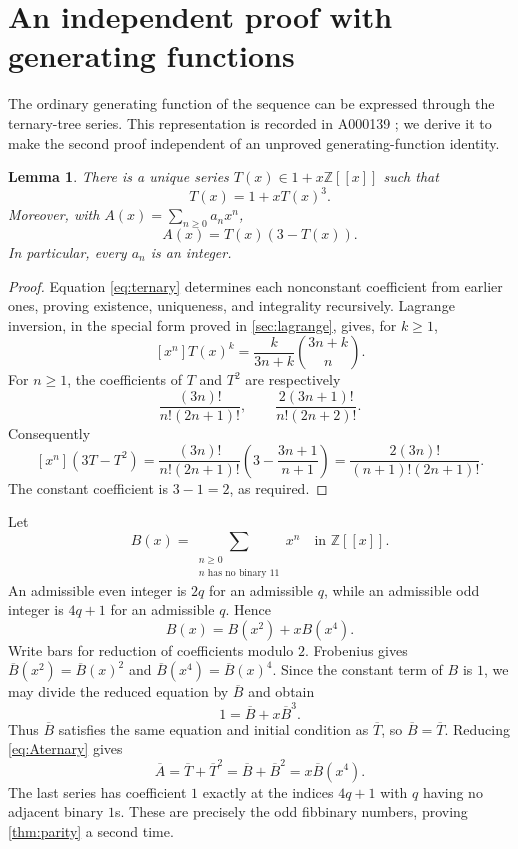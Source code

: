\documentclass[11pt]{article}
\newtheorem{lemma}[theorem]{Lemma}
\theoremstyle{definition}\newtheorem{definition}[theorem]{Definition}
\theoremstyle{remark}\newtheorem{remark}[theorem]{Remark}
\newcommand{\Z}{\mathbb Z}
\begin{document}
\section{An independent proof with generating functions}\label{sec:formal}

The ordinary generating function of the sequence can be expressed through
the ternary-tree series. This representation is recorded in A000139
\cite{OEIS139internal}; we derive it to make the second proof independent
of an unproved generating-function identity.

\begin{lemma}\label{lem:ternary}
There is a unique series $T(x)\in1+x\Z[[x]]$ such that
\begin{equation}\label{eq:ternary}
 T(x)=1+xT(x)^3.
\end{equation}
Moreover, with $A(x)=\sum_{n\geq0}a_nx^n$,
\begin{equation}\label{eq:Aternary}
 A(x)=T(x)(3-T(x)).
\end{equation}
In particular, every $a_n$ is an integer.
\end{lemma}
\begin{proof}
Equation \eqref{eq:ternary} determines each nonconstant coefficient from
earlier ones, proving existence, uniqueness, and integrality recursively.
Lagrange inversion, in the special form proved in
\cref{sec:lagrange}, gives, for $k\geq1$,
\[
 [x^n]T(x)^k=\frac{k}{3n+k}\binom{3n+k}{n}.
\]
For $n\geq1$, the coefficients of $T$ and $T^2$ are respectively
\[
 \frac{(3n)!}{n!(2n+1)!},\qquad
 \frac{2(3n+1)!}{n!(2n+2)!}.
\]
Consequently
\[
 [x^n](3T-T^2)
 =\frac{(3n)!}{n!(2n+1)!}
   \left(3-\frac{3n+1}{n+1}\right)
 =\frac{2(3n)!}{(n+1)!(2n+1)!}.
\]
The constant coefficient is $3-1=2$, as required.
\end{proof}

Let
\[
 B(x)=\sum_{\substack{n\geq0\\n\text{ has no binary }11}}x^n
 \quad\text{in }\Z[[x]].
\]
An admissible even integer is $2q$ for an admissible $q$, while an
admissible odd integer is $4q+1$ for an admissible $q$. Hence
\begin{equation}\label{eq:mahler}
 B(x)=B(x^2)+xB(x^4).
\end{equation}
Write bars for reduction of coefficients modulo $2$. Frobenius gives
$\overline B(x^2)=\overline B(x)^2$ and
$\overline B(x^4)=\overline B(x)^4$. Since the constant term of $B$ is
$1$, we may divide the reduced equation by $\overline B$ and obtain
\[
 1=\overline B+x\overline B^3.
\]
Thus $\overline B$ satisfies the same equation and initial condition as
$\overline T$, so $\overline B=\overline T$. Reducing
\eqref{eq:Aternary} gives
\begin{equation}\label{eq:mod2A}
 \overline A=\overline T+\overline T^2
 =\overline B+\overline B^2=x\overline B(x^4).
\end{equation}
The last series has coefficient $1$ exactly at the indices $4q+1$ with
$q$ having no adjacent binary $1$s. These are precisely the odd fibbinary
numbers, proving \cref{thm:parity} a second time.
\end{document}
